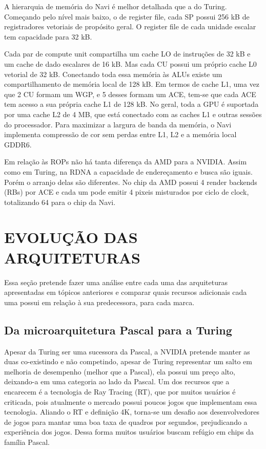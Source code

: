 \documentclass[letterpaper, 10 pt, conference]{ieeeconf}  %
\begin{document}
A hierarquia de memória do Navi é melhor detalhada que a do Turing. Começando pelo nível mais baixo, o de register file, cada SP possui 256 kB de registradores vetoriais de propósito geral. O register file de cada unidade escalar tem capacidade para 32 kB.

Cada par de compute unit compartilha um cache LO de instruções de 32 kB e um cache de dado escalares de 16 kB. Mas cada CU possui um próprio cache L0 vetorial de 32 kB. Conectando toda essa memória às ALUs existe um compartilhamento de memória local de 128 kB. Em termos de cache L1, uma vez que 2 CU formam um WGP, e 5 desses formam um ACE, tem-se que cada ACE tem acesso a sua própria cache L1 de 128 kB. No geral, toda a GPU é suportada por uma cache L2 de 4 MB, que está conectado com as caches L1 e outras sessões do processador. Para maximizar a largura de banda da memória, o Navi implementa compressão de cor sem perdas entre L1, L2 e a memória local GDDR6.

Em relação às ROPs não há tanta diferença da AMD para a NVIDIA. Assim como em Turing, na RDNA a capacidade de endereçamento e busca são iguais. Porém o arranjo delas são diferentes. No chip da AMD possui 4 render backends (RBs) por ACE e cada um pode emitir 4 pixeis misturados por ciclo de clock, totalizando 64 para o chip da Navi.



\section{EVOLUÇÃO DAS ARQUITETURAS}

Essa seção pretende fazer uma análise entre cada uma das arquiteturas apresentadas em tópicos anteriores e comparar quais recursos adicionais cada uma possui em relação à sua predecessora, para cada marca.

\subsection{Da microarquitetura Pascal para a Turing}

Apesar da Turing ser uma sucessora da Pascal, a NVIDIA pretende manter as duas co-existindo e não competindo, apesar de Turing representar um salto em melhoria de desempenho (melhor que a Pascal), ela possui um preço alto, deixando-a em uma categoria ao lado da Pascal. Um dos recursos que a encarecem é a tecnologia de Ray Tracing (RT), que por muitos usuários é criticada, pois atualmente o mercado possui poucos jogos que implementam essa tecnologia. Aliando o RT e definição 4K, torna-se um desafio aos desenvolvedores de jogos para mantar uma boa taxa de quadros por segundos, prejudicando a experiência dos jogos. Dessa forma muitos usuários buscam refúgio em chips da família Pascal.
\end{document}
